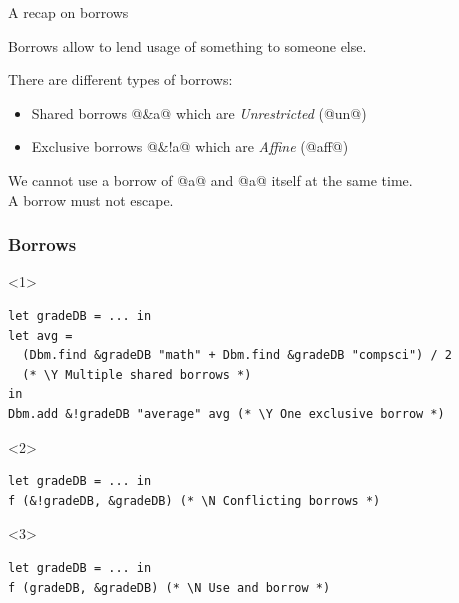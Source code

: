 \documentclass[aspectratio=169,dvipsnames,svgnames,10pt]{beamer}
\newcommand\Y{{\color{Green}{\ding{52}}}}
\newcommand\N{{\color{Red}{\ding{56}}}}
\begin{document}
\begin{frame}[fragile]{A recap on borrows}


  Borrows allow to lend usage of something to someone else.

  There are different types of borrows:
  \begin{itemize}
  \item Shared borrows @&a@ which are \emph{Unrestricted} (@un@)
  \item Exclusive borrows @&!a@ which are \emph{Affine} (@aff@)
  \end{itemize}

  We cannot use a borrow of @a@ and @a@ itself at the same time.\\
  A borrow must not escape.
\end{frame}


\begin{frame}[fragile]
  \frametitle{Borrows}
  \begin{onlyenv}<1>
\begin{verbatim}
let gradeDB = ... in
let avg =
  (Dbm.find &gradeDB "math" + Dbm.find &gradeDB "compsci") / 2
  (* \Y Multiple shared borrows *)
in
Dbm.add &!gradeDB "average" avg (* \Y One exclusive borrow *)
\end{verbatim}
\end{onlyenv}


\begin{onlyenv}<2>
\begin{verbatim}
let gradeDB = ... in
f (&!gradeDB, &gradeDB) (* \N Conflicting borrows *)
\end{verbatim}
\end{onlyenv}
\begin{onlyenv}<3>
\begin{verbatim}
let gradeDB = ... in
f (gradeDB, &gradeDB) (* \N Use and borrow *)
\end{verbatim}
\end{onlyenv}
\end{frame}
\end{document}
